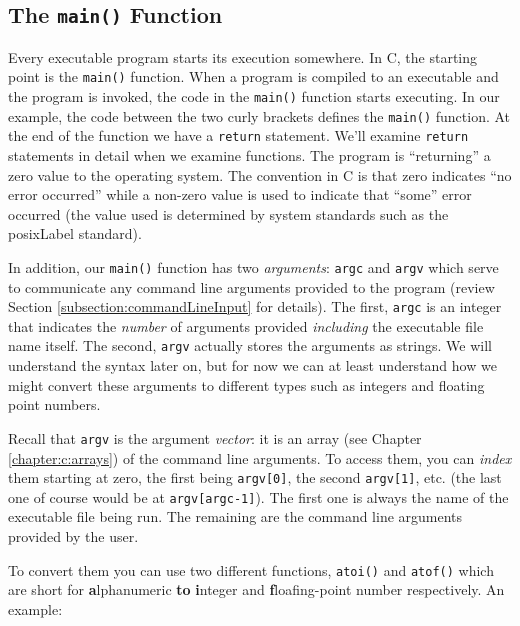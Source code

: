\subsection{The \texttt{main()} Function}

Every executable program starts its execution somewhere. In C, 
the starting point is the \texttt{main()}
function.  When a program is compiled to an executable and the program
is invoked, the code in the \texttt{main()} function starts executing.  In our example, the code between the two curly brackets defines the
\texttt{main()} function.
At the end of the function we have a \texttt{return} statement.  We'll
examine \texttt{return} statements in detail when we examine functions. 
The program is ``returning'' a zero value to the operating system.
The convention in C is that zero indicates ``no error occurred'' while a 
non-zero value is used to indicate that ``some'' error occurred (the 
value used is determined by system standards such as the \gls{posixLabel}
standard).

In addition, our \texttt{main()} function has two \emph{arguments}:
\texttt{argc} and \texttt{argv} which serve to communicate
any command line arguments provided to the program (review Section
\ref{subsection:commandLineInput} for details).  The first, \texttt{argc} is an integer that indicates
the \emph{number} of arguments provided \emph{including} the executable
file name itself.  The second, \texttt{argv} actually stores the 
arguments as strings.  We will understand the syntax later on, but
for now we can at least understand how we might convert these arguments
to different types such as integers and floating point numbers.

Recall that \texttt{argv} is the argument \emph{vector}: it 
is an array (see Chapter \ref{chapter:c:arrays}) of the command line arguments.  
To access them, you can \emph{index} them starting at zero, the first being \texttt{argv[0]}, the
second \texttt{argv[1]}, etc. (the last one of course would be at
\texttt{argv[argc-1]}).  The first one is always the name of the
executable file being run.  The remaining are the command line 
arguments provided by the user.

To convert them you can use two different functions, \texttt{atoi()}
and \texttt{atof()} which are short for \textbf{a}lphanumeric \textbf{to}
\textbf{i}nteger and \textbf{f}loafing-point number respectively.  An 
example:

